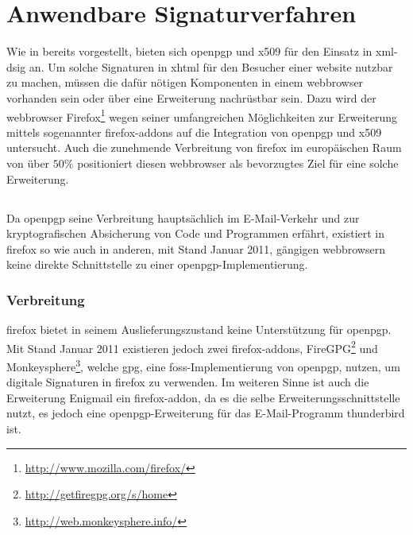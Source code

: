 

\chapter{Anwendbare Signaturverfahren}
\label{chap:Signaturverfahren}
Wie in  bereits vorgestellt, bieten sich \gls{openpgp} und \gls{x509} für den Einsatz in
\gls{xml-dsig} an. Um solche Signaturen in \gls{xhtml} für den Besucher einer \gls{website} nutzbar zu machen, müssen die dafür nötigen Komponenten in einem
\gls{webbrowser} vorhanden sein oder über eine Erweiterung nachrüstbar sein. Dazu wird der \gls{webbrowser}
Firefox\footnote{\url{http://www.mozilla.com/firefox/}} wegen seiner umfangreichen Möglichkeiten zur Erweiterung mittels sogenannter
\glspl{firefox-addon} auf die Integration von \gls{openpgp} und \gls{x509} untersucht. Auch die zunehmende Verbreitung von \gls{firefox} im europäischen Raum
von über $50\%$ \cite{firefox-verbreitung} positioniert diesen \gls{webbrowser} als bevorzugtes Ziel für eine solche Erweiterung.

\section{}
\label{sec:Signaturverfahren:OpenPGP}
Da \gls{openpgp} seine Verbreitung hauptsächlich im E-Mail-Verkehr \cite{2719799020071101} und zur kryptografischen Absicherung von Code und Programmen erfährt,
existiert in \gls{firefox} so wie auch in anderen, mit Stand Januar 2011, gängigen \gls{webbrowser}n keine direkte Schnittstelle zu einer
\gls{openpgp}-Implementierung.

\subsection{Verbreitung}
\gls{firefox} bietet in seinem Auslieferungszustand keine Unterstützung für \gls{openpgp}. Mit Stand Januar 2011 existieren jedoch zwei \glspl{firefox-addon},
FireGPG\footnote{\url{http://getfiregpg.org/s/home}} und
Monkeysphere\footnote{\url{http://web.monkeysphere.info/}}, welche \gls{gpg}, eine \gls{foss}-Implementierung von \gls{openpgp},
nutzen, um digitale Signaturen in \gls{firefox} zu verwenden. Im weiteren Sinne ist auch die Erweiterung Enigmail ein \gls{firefox-addon}, da es die selbe
Erweiterungsschnittstelle nutzt, es jedoch eine \gls{openpgp}-Erweiterung für das E-Mail-Programm \gls{thunderbird} ist.

